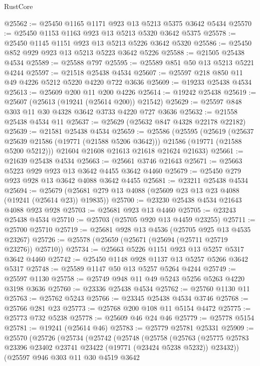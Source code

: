 \begin{lexlean}{RustCore}
\begin{coremodule}
@25562 := @25450 @1165 @1171 @923 @13 @5213 @5375 @3642 @5434
@25570 := @25450 @1153 @1163 @923 @13 @5213 @5320 @3642 @5375
@25578 := @25450 @1145 @1151 @923 @13 @5213 @5226 @3642 @5320
@25586 := @25450 @852 @929 @923 @13 @5213 @5223 @3642 @5226
@25588 := @21505 @25438 @4534
@25589 := @25588 @797
@25595 := @25589 @851 @50 @13 @5213 @5221 @4244
@25597 := @21518 @25438 @4534
@25607 := @25597 @218 @850 @11 @49 @4226 @5212 @5220 @4220 @722 @3636
@25609 := @19233 @25438 @4534
@25613 := @25609 @200 @11 @200 @4226
@25614 := @19242 @25438
@25619 := @25607 (@25613 (@19241 (@25614 @200)) @21542)
@25629 := @25597 @848 @303 @11 @30 @4328 @3642 @3733 @4220 @727 @3636
@25632 := @21558 @25438 @4534 @11
@25637 := @25629 (@25632 @847 @4328 @22178 @22182)
@25639 := @21581 @25438 @4534
@25659 := @25586
    (@25595
      (@25619
        (@25637 @25639 @21586 (@19771 (@21588 @5206 @3642)))
        @21586
        (@19771 (@21588 @5200 @5212)))
      @21604
      @21608
      @21613
      @21618
      @21624
      @21633)
@25661 := @21639 @25438 @4534
@25663 := @25661 @3746 @21643
@25671 := @25663 @5223 @929 @923 @13 @3642 @4455 @3642 @4460
@25679 := @25450 @279 @923 @928 @13 @3642 @4088 @3642 @4455
@25681 := @23211 @25438 @4534
@25694 := @25679 (@25681 @279 @13 @4088 (@25609 @23 @13 @23 @4088 (@19241 (@25614 @23)) @19835))
@25700 := @23230 @25438 @4534 @21643 @4088 @923 @928
@25703 := @25681 @923 @13 @4460
@25705 := @23243 @25438 @4534
@25710 := @25703 (@25705 @920 @13 @4459 @23255)
@25711 := @25700 @25710
@25719 := @25681 @928 @13 @4536 (@25705 @925 @13 @4535 @23267)
@25726 := @25578 (@25659 (@25671 (@25694 (@25711 @25719 @23276)) @25710))
@25734 := @25663 @5226 @1151 @923 @13 @5257 @5317 @3642 @4460
@25742 := @25450 @1148 @928 @1137 @13 @5257 @5266 @3642 @5317
@25748 := @25589 @1147 @50 @13 @5257 @5264 @4244
@25749 := @25597 @1130
@25758 := @25749 @948 @11 @49 @5243 @5256 @5263 @4220 @3198 @3636
@25760 := @23336 @25438 @4534
@25762 := @25760 @1130 @11
@25763 := @25762 @5243
@25766 := @23345 @25438 @4534 @3746
@25768 := @25766 @281 @23
@25773 := @25768 @200 @108 @11 @5154 @4472
@25775 := @25773 @732 @5238
@25778 := @25609 @46 @24 @46
@25779 := @25778 @5154
@25781 := @19241 (@25614 @46)
@25783 := @25779 @25781 @25331
@25909 := @25570
    (@25726
      (@25734
        (@25742
          (@25748
            (@25758
              (@25763
                (@25775 @25783 @23396 @23402 @23741 @23422 (@19771 (@23424 @5238 @5232)) @23432))
              (@25597
                @946
                @303
                @11
                @30
                @4519
                @3642

\end{coremodule}
\end{lexlean}
